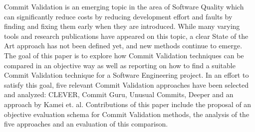 
Commit Validation is an emerging topic in the area of Software Quality which can significantly reduce costs by reducing development effort and faults by finding and fixing them early when they are introduced. While many varying tools and research publications have appeared on this topic, a clear State of the Art approach has not been defined yet, and new methods continue to emerge. 
The goal of this paper is to explore how Commit Validation techniques can be compared in an objective way as well as reporting on how to find a suitable Commit Validation technique for a Software Engineering project.
In an effort to satisfy this goal, five relevant Commit Validation approaches have been selected and analyzed: CLEVER, Commit Guru, Unusual Commits, Deeper and an approach by Kamei et. al.
Contributions of this paper include the proposal of an objective evaluation schema for Commit Validation methods, the analysis of the five approaches and an evaluation of this comparison.